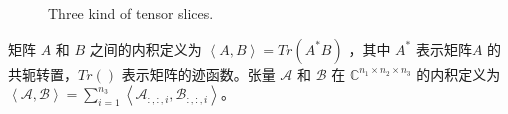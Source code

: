 \begin{figure}[htbp]
	\centering
	{Three kind of tensor slices.}
	\label{figure_slice}
\end{figure}

矩阵 $ A $ 和 $ B $ 之间的内积定义为 $ \left<A,B\right> = Tr(A^*B) $ ，其中 $ A^* $ 表示矩阵$ A $ 的共轭转置，$ Tr() $ 表示矩阵的迹函数。张量 $ \mathcal{A} $ 和 $ \mathcal{B} $ 在 $  \mathbb{C}^{n_1\times n_2\times n_3} $ 的内积定义为 $ \left< \mathcal{A} , \mathcal{B} \right> = \sum_{i=1}^{n_3} \left<\mathcal{A}_{:,:,i},\mathcal{B}_{:,:,i} \right> $。

